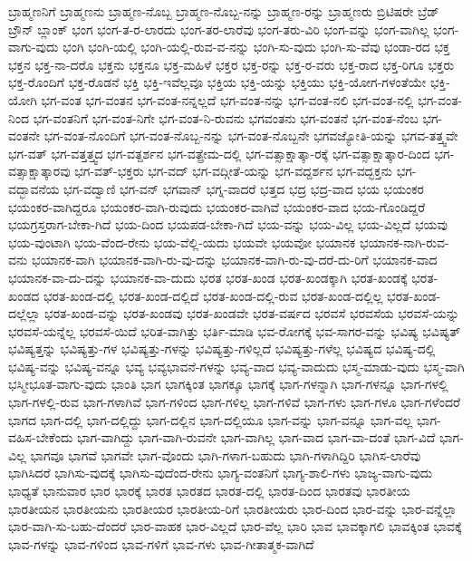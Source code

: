{ಬ್ರಾಹ್ಮಣನಿಗೆ
ಬ್ರಾಹ್ಮಣನು
ಬ್ರಾಹ್ಮಣ-ನೊಬ್ಬ
ಬ್ರಾಹ್ಮಣ-ನೊಬ್ಬ-ನನ್ನು
ಬ್ರಾಹ್ಮಣ-ರನ್ನು
ಬ್ರಾಹ್ಮಣರು
ಬ್ರಿಟಿಷರೇ
ಬ್ರೆಡ್
ಬ್ರೌನ್
ಬ್ಲಾಂಕ್
ಭಂಗ
ಭಂಗ-ತ-ರ-ಲಾರದು
ಭಂಗ-ತರ-ಲಾರೆವು
ಭಂಗ-ತರು-ವಿರಿ
ಭಂಗ-ವನ್ನು
ಭಂಗ-ವಾಗಿಲ್ಲ
ಭಂಗ-ವಾಗು-ವುದು
ಭಂಗಿ
ಭಂಗಿ-ಯಲ್ಲಿ
ಭಂಗಿ-ಯಲ್ಲಿ-ರುವ-ವ-ನನ್ನು
ಭಂಗಿ-ಸು-ವುದು
ಭಂಗಿ-ಸು-ವೆವು
ಭಂಡಾ-ರದ
ಭಕ್ತ
ಭಕ್ತನ
ಭಕ್ತ-ನಾ-ದರೊ
ಭಕ್ತನು
ಭಕ್ತನೂ
ಭಕ್ತ-ಮಹಿಳೆ
ಭಕ್ತರ
ಭಕ್ತ-ರನ್ನು
ಭಕ್ತ-ರ-ವರು
ಭಕ್ತ-ರಾದ
ಭಕ್ತ-ರಿಗೂ
ಭಕ್ತರು
ಭಕ್ತ-ರೊಂದಿಗೆ
ಭಕ್ತ-ರೊಡನೆ
ಭಕ್ತಿ
ಭಕ್ತಿ-ಇವೆಲ್ಲವೂ
ಭಕ್ತಿಯ
ಭಕ್ತಿ-ಯನ್ನು
ಭಕ್ತಿಯು
ಭಕ್ತಿ-ಯೋಗ-ಗಳಂತೆಯೇ
ಭಕ್ತಿ-ಯೋಗಿ
ಭಗ-ವಂತ
ಭಗ-ವಂತನ
ಭಗ-ವಂತ-ನನ್ನಲ್ಲದೆ
ಭಗ-ವಂತ-ನನ್ನು
ಭಗ-ವಂತ-ನಲಿ
ಭಗ-ವಂತ-ನಲ್ಲಿ
ಭಗ-ವಂತ-ನಿಂದ
ಭಗ-ವಂತನಿಗೆ
ಭಗ-ವಂತ-ನಿಗೇ
ಭಗ-ವಂತ-ನಿ-ರುವನು
ಭಗವಂತನು
ಭಗ-ವಂತನೆ
ಭಗ-ವಂತ-ನೆಂಬ
ಭಗ-ವಂತನೇ
ಭಗ-ವಂತ-ನೊಂದಿಗೆ
ಭಗ-ವಂತ-ನೊಬ್ಬ-ನನ್ನು
ಭಗ-ವಂತ-ನೊಬ್ಬನೇ
ಭಗವಜ್ಯೋತಿ-ಯನ್ನು
ಭಗವ-ತತ್ತ್ವವೇ
ಭಗ-ವತ್
ಭಗ-ವತ್ತತ್ತ್ವದ
ಭಗ-ವತ್ದರ್ಶನ
ಭಗ-ವತ್ಪ್ರೇಮ-ದಲ್ಲಿ
ಭಗ-ವತ್ಸಾಕ್ಷಾತ್ಕಾ-ರಕ್ಕೆ
ಭಗ-ವತ್ಸಾಕ್ಷಾತ್ಕಾರ-ದಿಂದ
ಭಗ-ವತ್ಸಾಕ್ಷಾತ್ಕಾರವು
ಭಗ-ವತ್-ಭಕ್ತರು
ಭಗ-ವದ್
ಭಗ-ವದ್ಗೀತೆ-ಯನ್ನು
ಭಗ-ವದ್ದರ್ಶನ
ಭಗ-ವದ್ಭಕ್ತನು
ಭಗ-ವದ್ಭಾವನೆಯ
ಭಗ-ವದ್ವಾಣಿ
ಭಗ-ವನ್
ಭಗವಾನ್
ಭಗ್ನ-ವಾದರೆ
ಭತ್ತದ
ಭದ್ರ
ಭದ್ರ-ವಾದ
ಭಯ
ಭಯಂಕರ
ಭಯಂಕರ-ವಾಗಿದ್ದರೂ
ಭಯಂಕರ-ವಾಗಿ-ರುವುದು
ಭಯಂಕರ-ವಾಗಿವೆ
ಭಯಂಕರ-ವಾದ
ಭಯ-ಗೊಂಡಿದ್ದರೆ
ಭಯಗ್ರಸ್ತರಾಗ-ಬೇಕಾ-ಗಿದೆ
ಭಯ-ದಿಂದ
ಭಯಪಡ-ಬೇಕಾ-ಗಿದೆ
ಭಯ-ವನ್ನು
ಭಯ-ವಿಲ್ಲ
ಭಯ-ವಿಲ್ಲದೆ
ಭಯವು
ಭಯ-ವುಂಟಾಗಿ
ಭಯ-ವೆಂದ-ರೇನು
ಭಯ-ವೆಲ್ಲಿ-ಯದು
ಭಯವೇ
ಭಯವೋ
ಭಯಾನಕ
ಭಯಾನಕ-ನಾಗಿ-ರುವ-ವನು
ಭಯಾನಕ-ವಾಗಿ
ಭಯಾನಕ-ವಾಗಿ-ರು-ವು-ದನ್ನು
ಭಯಾನಕ-ವಾಗಿ-ರು-ವು-ದರೆ-ದು-ರಿಗೆ
ಭಯಾನಕ-ವಾದ
ಭಯಾನಕ-ವಾ-ದು-ದನ್ನು
ಭಯಾನಕ-ವಾ-ದುದು
ಭರತ
ಭರತ-ಖಂಡ
ಭರತ-ಖಂಡಕ್ಕಾಗಿ
ಭರತ-ಖಂಡಕ್ಕೆ
ಭರತ-ಖಂಡದ
ಭರತ-ಖಂಡ-ದಲ್ಲಿ
ಭರತ-ಖಂಡ-ದಲ್ಲಿದೆ
ಭರತ-ಖಂಡ-ದಲ್ಲಿ-ರುವ
ಭರತ-ಖಂಡ-ದಲ್ಲಿಲ್ಲ
ಭರತ-ಖಂಡ-ದಲ್ಲೆಲ್ಲಾ
ಭರತ-ಖಂಡ-ವನ್ನು
ಭರತ-ಖಂಡವು
ಭರತ-ಖಂಡವೇ
ಭರತ-ವರ್ಷದ
ಭರವಸೆ
ಭರವಸೆಯ
ಭರವಸೆ-ಯನ್ನು
ಭರವಸೆ-ಯನ್ನೆಲ್ಲ
ಭರವಸೆ-ಯಿದೆ
ಭರಿತ-ವಾಗಿತ್ತು
ಭರ್ತಿ-ಮಾಡಿ
ಭವ-ರೋಗಕ್ಕೆ
ಭವ-ಸಾಗರ-ವನ್ನು
ಭವಿಷ್ಯ
ಭವಿಷ್ಯತ್
ಭವಿಷ್ಯತ್ತನ್ನು
ಭವಿಷ್ಯತ್ತು-ಗಳ
ಭವಿಷ್ಯತ್ತು-ಗಳನ್ನು
ಭವಿಷ್ಯತ್ತು-ಗಳಿಲ್ಲದೆ
ಭವಿಷ್ಯತ್ತು-ಗಳೆಲ್ಲ
ಭವಿಷ್ಯದ
ಭವಿಷ್ಯ-ದಲ್ಲಿ
ಭವಿಷ್ಯ-ವನ್ನು
ಭವಿಷ್ಯ-ವನ್ನೂ
ಭವ್ಯ
ಭವ್ಯಭಾವನೆ-ಗಳನ್ನು
ಭವ್ಯ-ವಾದ
ಭವ್ಯ-ವಾದುದು
ಭಸ್ಮ-ಮಾಡು-ವುದು
ಭಸ್ಮ-ವಾಗಿ
ಭಸ್ಮೀಭೂತ-ವಾಗು-ವುದು
ಭಾಂತಿ
ಭಾಗ
ಭಾಗಕ್ಕಿಂತ
ಭಾಗಕ್ಕೂ
ಭಾಗಕ್ಕೆ
ಭಾಗ-ಗಳನ್ನಾಗಿ
ಭಾಗ-ಗಳನ್ನೂ
ಭಾಗ-ಗಳಲ್ಲಿ
ಭಾಗ-ಗಳಲ್ಲಿ-ರುವ
ಭಾಗ-ಗಳಾಗಿವೆ
ಭಾಗ-ಗಳಿಂದ
ಭಾಗ-ಗಳಿಲ್ಲ
ಭಾಗ-ಗಳಿವೆ
ಭಾಗ-ಗಳು
ಭಾಗ-ಗಳೂ
ಭಾಗ-ಗಳೆಂದರೆ
ಭಾಗದ
ಭಾಗ-ದಲ್ಲಿ
ಭಾಗ-ದಲ್ಲಿದ್ದು
ಭಾಗ-ದಲ್ಲಿನ
ಭಾಗ-ದಲ್ಲಿಯೂ
ಭಾಗ-ವನ್ನು
ಭಾಗ-ವನ್ನೂ
ಭಾಗ-ವಲ್ಲ
ಭಾಗ-ವಹಿಸ-ಬೇಕೆಂದು
ಭಾಗ-ವಾಗಿದ್ದು
ಭಾಗ-ವಾಗಿ-ರುವನೇ
ಭಾಗ-ವಾಗಿಲ್ಲ
ಭಾಗ-ವಾದ
ಭಾಗ-ವಾ-ದಂತೆ
ಭಾಗ-ವಿದೆ
ಭಾಗ-ವಿಲ್ಲ
ಭಾಗವೂ
ಭಾಗವೆ
ಭಾಗವೇ
ಭಾಗ-ವೊಂದು
ಭಾಗಿ-ಗಳಾಗ-ಬಹುದು
ಭಾಗಿ-ಗಳಾಗಿದ್ದಿರಿ
ಭಾಗಿಸ-ಲಾರೆವು
ಭಾಗಿಸಿದರೆ
ಭಾಗಿಸು-ವುದಕ್ಕೆ
ಭಾಗಿಸು-ವುದೆಂದ-ರೇನು
ಭಾಗ್ಯ-ವಂತನಿಗೆ
ಭಾಗ್ಯ-ಶಾಲಿ-ಗಳು
ಭಾಜ್ಯ-ವಾಗು-ವುದು
ಭಾಧ್ಯತೆ
ಭಾನುವಾರ
ಭಾರ
ಭಾರಕ್ಕೆ
ಭಾರತ
ಭಾರತದ
ಭಾರತ-ದಲ್ಲಿ
ಭಾರತ-ದಿಂದ
ಭಾರತವು
ಭಾರತೀಯ
ಭಾರತೀಯನ
ಭಾರತೀಯನು
ಭಾರತೀಯರ
ಭಾರತೀಯ-ರಿಗೆ
ಭಾರತೀಯರು
ಭಾರ-ದಿಂದ
ಭಾರ-ವನ್ನು
ಭಾರ-ವನ್ನೆಲ್ಲಾ
ಭಾರ-ವಾಗಿ-ಸು-ಬಹು-ದೆಂದರೆ
ಭಾರ-ವಾಹಕ
ಭಾರ-ವಿಲ್ಲದೆ
ಭಾರ-ವೆಲ್ಲ
ಭಾರಿ
ಭಾವ
ಭಾವಕ್ಕಾಗಲಿ
ಭಾವಕ್ಕಿಂತ
ಭಾವಕ್ಕೆ
ಭಾವ-ಗಳನ್ನು
ಭಾವ-ಗಳಿಂದ
ಭಾವ-ಗಳಿಗೆ
ಭಾವ-ಗಳು
ಭಾವ-ಗೀತಾತ್ಮಕ-ವಾಗಿದೆ
}
